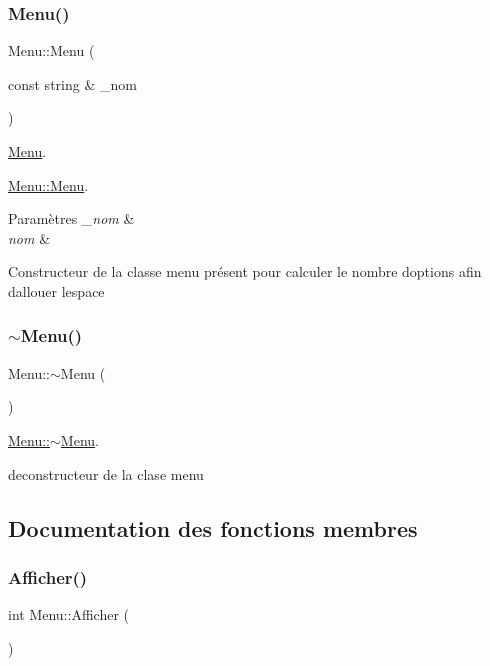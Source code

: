 \subsubsection{\texorpdfstring{Menu()}{Menu()}}
{\footnotesize\ttfamily Menu\+::\+Menu (\begin{DoxyParamCaption}\item[{const string \&}]{\+\_\+nom }\end{DoxyParamCaption})}



\hyperlink{class_menu}{Menu}. 

\hyperlink{class_menu_a2733b73d7c4dff4b1db19afd45f255b9}{Menu\+::\+Menu}.


\begin{DoxyParams}{Paramètres}
{\em \+\_\+nom} & \\
\hline
{\em nom} & \\
\hline
\end{DoxyParams}
Constructeur de la classe menu présent pour calculer le nombre d\textquotesingle{}options afin d\textquotesingle{}allouer l\textquotesingle{}espace \mbox{\label{class_menu_a831387f51358cfb88cd018e1777bc980}} 
\subsubsection{\texorpdfstring{$\sim$\+Menu()}{~Menu()}}
{\footnotesize\ttfamily Menu\+::$\sim$\+Menu (\begin{DoxyParamCaption}{ }\end{DoxyParamCaption})}



\hyperlink{class_menu_a831387f51358cfb88cd018e1777bc980}{Menu\+::$\sim$\+Menu}. 

deconstructeur de la clase menu 

\subsection{Documentation des fonctions membres}
\mbox{\label{class_menu_a079e0c6a24248a07993b48b310ba65ce}} 
\subsubsection{\texorpdfstring{Afficher()}{Afficher()}}
{\footnotesize\ttfamily int Menu\+::\+Afficher (\begin{DoxyParamCaption}{ }\end{DoxyParamCaption})}



